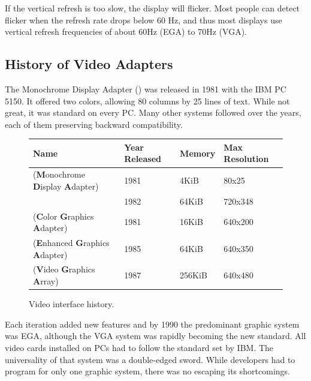 \documentclass[book.tex]{subfiles}
\begin{document}
\par
If the vertical refresh is too slow, the display will flicker. Most people can detect flicker when the refresh rate drops below 60 Hz, and thus most displays use vertical refresh frequencies of about 60Hz (EGA) to 70Hz (VGA). 



  \subsection{History of Video Adapters}

The Monochrome Display Adapter () was released in 1981 with the IBM PC 5150. It offered two colors, allowing 80 columns by 25 lines of text.  While not great, it was standard on every PC. Many other systems followed over the years, each of them preserving backward compatibility.

\bigskip
 \begin{figure}[H]
\centering  
\begin{tabularx}{\textwidth}{ l X l Y }
  \toprule
  \textbf{Name} &  \textbf{Year Released} & \textbf{Memory} & \textbf{Max Resolution}\\
  \toprule {}
   (\textbf{M}onochrome
   \textbf{D}isplay
   \textbf{A}dapter) & 1981 & 4KiB & 80x25\footnotemark 
   \\  & 1982 & 64KiB & 720x348
   \\ 
   (\textbf{C}olor
   \textbf{G}raphics
   \textbf{A}dapter) & 1981 & 16KiB & 640x200
    \\ 
   (\textbf{E}nhanced
   \textbf{G}raphics
   \textbf{A}dapter) & 1985 & 64KiB & 640x350
   \\ 
   (\textbf{V}ideo
   \textbf{G}raphics
   \textbf{A}rray)  & 1987 & 256KiB & 640x480
    \\
  \toprule
\end{tabularx}
\caption{Video interface history.}\label{fig:vga_history}
   
\end{figure}
\addtocounter{footnote}{-1}


Each iteration added new features and by 1990 the predominant graphic system was EGA, although the VGA system was rapidly becoming the new standard. All video cards installed on PCs had to follow the standard set by IBM. The universality of that system was a double-edged sword. While developers had to program for only one graphic system, there was no escaping its shortcomings.\\
\end{document}
